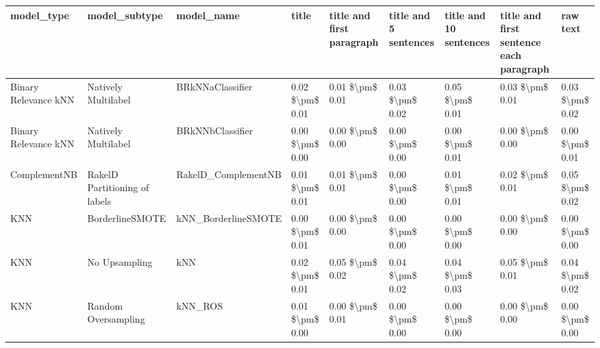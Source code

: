 \begin{tabular}{lllllllll}
\toprule
                     model\_type &                 model\_subtype &                                   model\_name &           title & title and first paragraph & title and 5 sentences & title and 10 sentences & title and first sentence each paragraph &            raw text \\
\midrule
           Binary Relevance kNN &           Natively Multilabel &                             BRkNNaClassifier & 0.02 \$\textbackslash pm\$ 0.01 &           0.01 \$\textbackslash pm\$ 0.01 &       0.03 \$\textbackslash pm\$ 0.02 &        0.05 \$\textbackslash pm\$ 0.01 &                         0.03 \$\textbackslash pm\$ 0.01 &     0.03 \$\textbackslash pm\$ 0.02 \\
           Binary Relevance kNN &           Natively Multilabel &                             BRkNNbClassifier & 0.00 \$\textbackslash pm\$ 0.00 &           0.00 \$\textbackslash pm\$ 0.00 &       0.00 \$\textbackslash pm\$ 0.00 &        0.00 \$\textbackslash pm\$ 0.01 &                         0.00 \$\textbackslash pm\$ 0.00 &     0.00 \$\textbackslash pm\$ 0.01 \\
                   ComplementNB & RakelD Partitioning of labels &                          RakelD\_ComplementNB & 0.01 \$\textbackslash pm\$ 0.01 &           0.01 \$\textbackslash pm\$ 0.01 &       0.00 \$\textbackslash pm\$ 0.00 &        0.01 \$\textbackslash pm\$ 0.01 &                         0.02 \$\textbackslash pm\$ 0.01 &     0.05 \$\textbackslash pm\$ 0.02 \\
                            KNN &               BorderlineSMOTE &                          kNN\_BorderlineSMOTE & 0.00 \$\textbackslash pm\$ 0.01 &           0.00 \$\textbackslash pm\$ 0.00 &       0.00 \$\textbackslash pm\$ 0.00 &        0.00 \$\textbackslash pm\$ 0.00 &                         0.00 \$\textbackslash pm\$ 0.00 &     0.00 \$\textbackslash pm\$ 0.00 \\
                            KNN &                 No Upsampling &                                          kNN & 0.02 \$\textbackslash pm\$ 0.01 &           0.05 \$\textbackslash pm\$ 0.02 &       0.04 \$\textbackslash pm\$ 0.02 &        0.04 \$\textbackslash pm\$ 0.03 &                         0.05 \$\textbackslash pm\$ 0.01 &     0.04 \$\textbackslash pm\$ 0.02 \\
                            KNN &           Random Oversampling &                                      kNN\_ROS & 0.01 \$\textbackslash pm\$ 0.00 &           0.00 \$\textbackslash pm\$ 0.01 &       0.00 \$\textbackslash pm\$ 0.00 &        0.00 \$\textbackslash pm\$ 0.00 &                         0.00 \$\textbackslash pm\$ 0.00 &     0.00 \$\textbackslash pm\$ 0.00 \\

\end{tabular}
